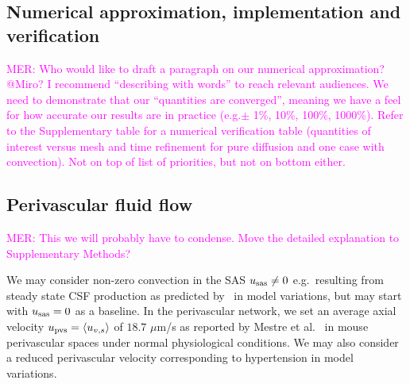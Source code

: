 \documentclass[fleqn,10pt]{wlscirep}
\newcommand{\mer}[1]{\textcolor{magenta}{#1}}
\begin{document}

\subsection*{Numerical approximation, implementation and verification}

\mer{MER: Who would like to draft a paragraph on our numerical approximation? @Miro? I recommend ``describing with words'' to reach relevant audiences. We need to demonstrate that our ``quantities are converged'', meaning we have a feel for how accurate our results are in practice (e.g.$\pm$ 1\%, 10\%, 100\%, 1000\%). Refer to the Supplementary table for a numerical verification table (quantities of interest versus mesh and time refinement for pure diffusion and one case with convection). Not on top of list of priorities, but not on bottom either.} 

\subsection*{Perivascular fluid flow}

\mer{MER: This we will probably have to condense. Move the detailed explanation to Supplementary Methods?}

We may consider non-zero convection in the SAS $u_{\rm sas} \not = 0$ e.g.~resulting from steady state CSF production as predicted by~\cite{hornkjol2022csf} in model variations, but may start with $u_{\rm sas} = 0$ as a baseline. In the perivascular network, we set an average axial velocity $u_{\rm pvs} = \langle u_{v, s} \rangle$ of $18.7$ $\mu$m/s as reported by Mestre et al.~\cite{mestre2018flow} in mouse perivascular spaces under normal physiological conditions. We may also consider a reduced perivascular velocity corresponding to hypertension in model variations.
\end{document}

